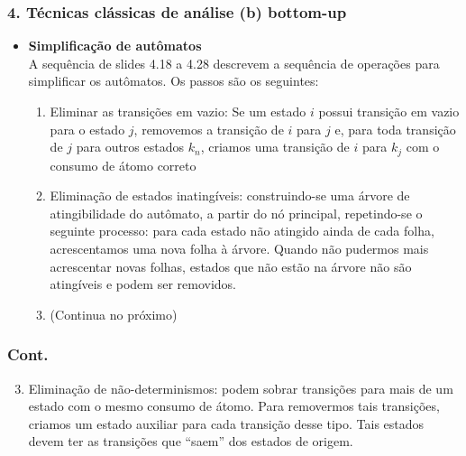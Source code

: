 \documentclass{beamer}
\begin{document}
\begin{frame}[fragile]
  \frametitle{4. T\'ecnicas cl\'assicas de an\'alise (b) bottom-up}
  \begin{itemize}
  \item \textbf{Simplifica\c c\~ao de aut\^omatos}\\
    A sequ\^encia de slides 4.18 a 4.28 descrevem a sequ\^encia de
    opera\c c\~oes para simplificar os aut\^omatos. Os passos s\~ao os
    seguintes:
    \begin{enumerate}
    \item Eliminar as transi\c c\~oes em vazio: Se um estado $i$ possui
      transi\c c\~ao em vazio para o estado $j$, removemos a transi\c
      c\~ao de $i$ para $j$ e, para toda transi\c c\~ao de $j$ para
      outros estados $k_n$, criamos uma transi\c c\~ao de $i$ para
      $k_j$ com o consumo de \'atomo correto
    \item Elimina\c c\~ao de estados inating\'iveis: construindo-se
      uma \'arvore de atingibilidade do aut\^omato, a partir do n\'o
      principal, repetindo-se o seguinte processo: para cada estado
      n\~ao atingido ainda de cada folha, acrescentamos uma nova folha
      \`a \'arvore. Quando n\~ao pudermos mais acrescentar novas
      folhas, estados que n\~ao est\~ao na \'arvore n\~ao s\~ao
      ating\'iveis e podem ser removidos.
    \item (Continua no pr\'oximo)
    \end{enumerate}
  \end{itemize}

\end{frame}

\begin{frame}[fragile]
  \frametitle{Cont.}
  \begin{enumerate}
\setcounter{enumi}{2}
  \item Elimina\c c\~ao de n\~ao-determinismos: podem sobrar
      transi\c c\~oes para mais de um estado com o mesmo consumo de
      \'atomo. Para removermos tais transi\c c\~oes, criamos um estado
      auxiliar para cada transi\c c\~ao desse tipo. Tais estados devem
      ter as transi\c c\~oes que ``saem'' dos estados de origem.
  \end{enumerate}
\end{frame}
\end{document}

